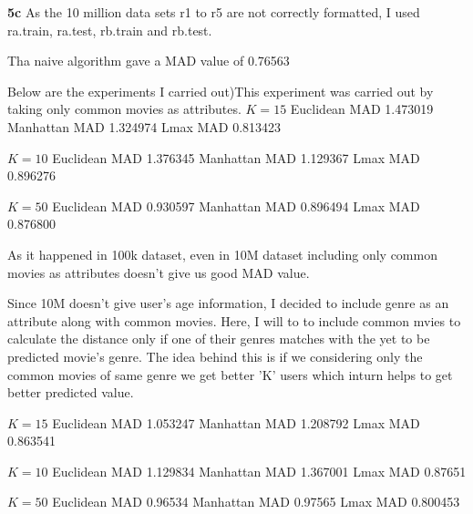 \documentclass{article}
\begin{document}
\textbf{5c}
As the 10 million data sets r1 to r5 are not correctly formatted, I used ra.train, ra.test, rb.train and rb.test. \newline

Tha naive algorithm gave a MAD value of 0.76563

Below are the experiments I carried out)This experiment was carried out by taking only common movies as attributes.\newline
$K=15$\newline
Euclidean MAD 1.473019\newline
Manhattan MAD 1.324974\newline
Lmax MAD 0.813423\newline

$K=10$
Euclidean MAD 1.376345\newline
Manhattan MAD 1.129367\newline
Lmax MAD 0.896276\newline

$K=50$
Euclidean MAD 0.930597\newline
Manhattan MAD 0.896494\newline
Lmax MAD 0.876800\newline

As it happened in 100k dataset, even in 10M dataset including only common movies as attributes doesn't give us good MAD value.\newline

Since 10M doesn't give user's age information, I decided to include genre as an attribute along with common movies. Here, I will to to include common mvies to calculate the distance only if one of their genres matches with the yet to be predicted movie's genre. The idea behind this is if we considering only the common movies of same genre we get better 'K' users which inturn helps to get better predicted value.

$K=15$\newline
Euclidean MAD 1.053247\newline
Manhattan MAD 1.208792\newline
Lmax MAD 0.863541\newline

$K=10$
Euclidean MAD 1.129834\newline
Manhattan MAD 1.367001\newline
Lmax MAD 0.87651\newline

$K=50$
Euclidean MAD 0.96534\newline
Manhattan MAD 0.97565\newline
Lmax MAD 0.800453\newline
\end{document}

